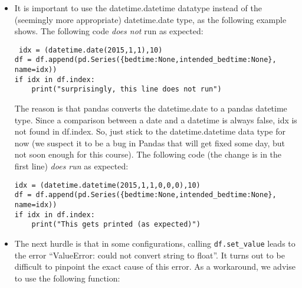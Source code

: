 \documentclass[a4paper]{report}
\theoremstyle{definition}
\newcommand{\doublequote}{\texttt{"}}
\newcommand{\singlequote}{\char13}
\begin{document}
\begin{itemize}
	\setlength\itemsep{1mm}
	
	\item It is important to use the datetime.datetime datatype instead of the (seemingly more appropriate) datetime.date type, as the following example shows. The following code \emph{does not} run as expected:
	
	\texttt{\small
		idx = (datetime.date(2015,1,1),10)\\
		df =
		df.append(pd.Series(\{\singlequote{}bedtime\singlequote{}:None,\singlequote{}intended\_bedtime\singlequote{}:None\}, name=idx))\\
		if idx in df.index:\\
		\mbox{}~~~~print(\doublequote{}surprisingly, this line does not
		run\doublequote{})
	}
	
	The reason is that pandas converts the datetime.date to a pandas datetime type. Since a comparison between a date and a datetime is always false, idx is not found in df.index. So, just stick to the datetime.datetime data type for now (we suspect it to be a bug in Pandas that will get fixed some day, but not soon enough for this course). The following code (the change is in the first line) \emph{does run} as expected:
		
	\texttt{\small idx = (datetime.datetime(2015,1,1,0,0,0),10)\\
		df =
		df.append(pd.Series(\{\singlequote{}bedtime\singlequote{}:None,\singlequote{}intended\_bedtime\singlequote{}:None\}, name=idx))\\
		if idx in df.index:\\
		\mbox{}~~~~print(\doublequote{}This gets printed (as expected)\doublequote{})
	}
	
	\item The next hurdle is that in some configurations, calling \texttt{\small df.set\_value} leads to the error ``ValueError: could not convert string to float''. It turns out to be difficult to pinpoint the exact cause of this error. As a workaround, we advise to use the following function:
	

\end{itemize}
\end{document}
